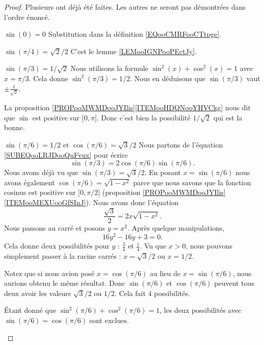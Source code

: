 \begin{proof}
	Plusieurs ont déjà été faites. Les autres ne seront pas démontrées dans l'ordre énoncé.
	\begin{subproof}
		\item[$\sin(0)=0$]
		Substitution dans la définition \eqref{EQooCMRFooCTtpge}.
		\item[$ \sin(\pi/4)=\sqrt{ 2 }/2$]
		C'est le lemme \ref{LEMooIGNPooPEctJy}.
		\item[$ \sin(\pi/3)=1/\sqrt{ 2 }$]
		Nous utilisons la formule \( \sin^2(x)+\cos^2(x)=1\) avec \( x=\pi/3\). Cela donne \( \sin^2(\pi/3)=1/2\). Nous en déduisons que \( \sin(\pi/3)\) vaut \( \pm\frac{1}{ \sqrt{ 2 } }\).

		La proposition \ref{PROPooMWMDooJYIlis}\ref{ITEMooHDQNooYHVCkg} nous dit que \( \sin\) est positive sur \(\mathopen[ 0 , \pi \mathclose]\). Donc c'est bien la possibilité \( 1/\sqrt{ 2 }\) qui est la bonne.
		\item[$\sin(\pi/6)=1/2$ et $\cos(\pi/6)=\sqrt{ 3 }/2 $]
		Nous partons de l'équation \eqref{SUBEQooLRJDooQuFvux} pour écrire
		\begin{equation}
			\sin(\pi/3)=2\cos(\pi/6)\sin(\pi/6).
		\end{equation}
		Nous avons déjà vu que \( \sin(\pi/3)=\sqrt{ 3 }/2\). En posant \( x=\sin(\pi/6)\) nous avons également \( \cos(\pi/6)=\sqrt{ 1-x^2 }\) parce que nous savons que la fonction cosinus est positive sur \( \mathopen[ 0 , \pi/2 \mathclose]\) (proposition \ref{PROPooMWMDooJYIlis}\ref{ITEMooMEXUooGfSInJ}). Nous avons donc l'équation
		\begin{equation}
			\frac{ \sqrt{ 3 } }{2}=2x\sqrt{ 1-x^2 }.
		\end{equation}
		Nous passons au carré et posons \( y=x^2\). Après quelque manipulations,
		\begin{equation}
			16y^2-16y+3=0.
		\end{equation}
		Cela donne deux possibilités pour \( y\) : \( \frac{ 3 }{ 4 }\) et \( \frac{1}{ 4 }\). Vu que \( x>0\), nous pouvons simplement passer à la racine carrés : \( x=\sqrt{ 3 }/2\) ou \( x=1/2\).

		Notez que si nous avion posé \( x=\cos(\pi/6)\) au lieu de \( x=\sin(\pi/6)\), nous aurions obtenu le même résultat. Donc \( \sin(\pi/6)\) et \( \cos(\pi/6)\) peuvent tous deux avoir les valeurs \( \sqrt{ 3 }/2\) ou \( 1/2\). Cela fait \( 4\) possibilités.

		Étant donné que \( \sin^2(\pi/6)+\cos^2(\pi/6)=1\), les deux possibilités avec \( \sin(\pi/6)=\cos(\pi/6)\) sont exclues.


\end{subproof}
\end{proof}
